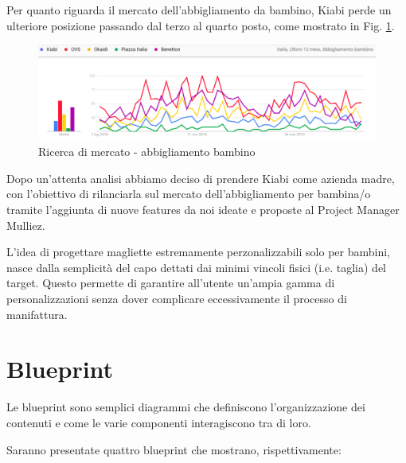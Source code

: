 \documentclass[12pt,italian,]{report}
\begin{document}
Per quanto riguarda il mercato dell'abbigliamento da bambino, Kiabi perde un ulteriore posizione passando dal terzo al quarto posto, come mostrato in Fig. \ref{abbigliamento_bambino}.

\begin{figure}[h]
\centering
\includegraphics{img/abbigliamento_bambino.png}
\caption{Ricerca di mercato - abbigliamento bambino}
\label{abbigliamento_bambino}
\end{figure}

Dopo un'attenta analisi abbiamo deciso di prendere Kiabi come azienda madre, con l'obiettivo di rilanciarla sul mercato dell'abbigliamento per bambina/o tramite l'aggiunta di nuove features da noi ideate e proposte al Project Manager Mulliez.

L'idea di progettare magliette estremamente perzonalizzabili solo per bambini, nasce dalla semplicità del capo dettati dai minimi vincoli fisici (i.e. taglia) del target. Questo permette di garantire all'utente un'ampia gamma di personalizzazioni senza dover complicare eccessivamente
il processo di manifattura.

\newpage
\section{Blueprint}\label{Blueprint}
Le blueprint sono semplici diagrammi che definiscono l'organizzazione dei contenuti e come le varie componenti interagiscono tra di loro.

Saranno presentate quattro blueprint che mostrano, rispettivamente:
\end{document}
